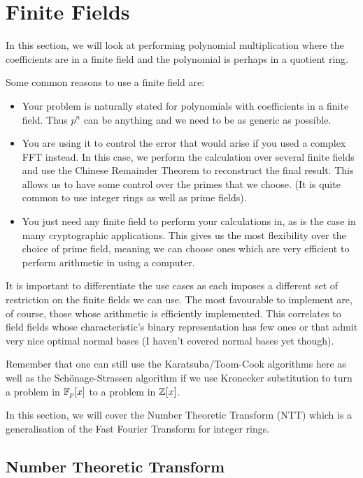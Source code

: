 \chapter{Finite Fields}\label{finite-fields}

In this section, we will look at performing polynomial multiplication where the coefficients are in a finite field and the polynomial is perhaps in a quotient ring.

Some common reasons to use a finite field are:
\begin{itemize}
\item Your problem is naturally stated for polynomials with coefficients
in a finite field. Thus $p^n$ can be anything and we need to be as generic as possible.
\item You are using it to control the error that would arise if you used a complex FFT instead. In this case, we perform the calculation over several finite fields and use the Chinese Remainder Theorem to reconstruct the final result. This allows us to have some control over the primes that we choose. (It is quite common to use integer rings as well as prime fields).
\item You just need any finite field to perform your calculations in, as is the case in many cryptographic applications. This gives us the most flexibility over the choice of prime field, meaning we can choose ones which are very efficient to perform arithmetic in using a computer.
\end{itemize}

It is important to differentiate the use cases as each imposes a different set of restriction on the finite fields we can use. The most favourable to implement are, of course, those whose arithmetic is efficiently implemented. This correlates to field fields whose characteristic's binary representation has few ones or that admit very nice optimal normal bases (I haven't covered normal bases yet though).

Remember that one can still use the Karatsuba/Toom-Cook algorithms here as well as the Sch\"{o}nage-Strassen algorithm if we use Kronecker substitution to turn a problem in $\mathbb{F}_p[x]$ to a problem in ${\mathbb Z}[x]$.

In this section, we will cover the Number Theoretic Transform (NTT) which is a generalisation of the Fast Fourier Transform for integer rings. 

\section{Number Theoretic Transform}
\label{sec:ntt}

